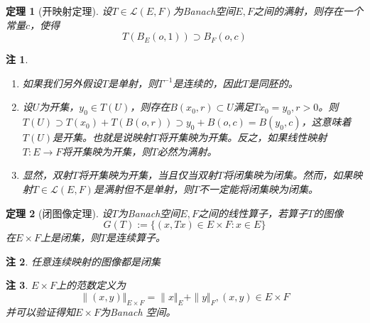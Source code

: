 \documentclass{article}                     %
\numberwithin{equation}{section}            %
\numberwithin{figure}{section}              %
\numberwithin{table}{section}               %
\newtheorem{theorem}{\indent 定理}[section] %
\newtheorem{remark}{\indent 注}[section]
\begin{document}
\begin{theorem}[开映射定理]
    设$T\in \mathcal{L} (E,F)$为Banach空间$E,F$之间的满射，则存在一个常量$c$，使得
    $$T(B_E(o,1))\supset B_F(o,c)$$
\end{theorem}
\begin{remark}
    \begin{enumerate}
        \item 如果我们另外假设$T$是单射，则$T^{-1}$是连续的，因此$T$是同胚的。
        \item 设$U$为开集，$y_0\in T(U)$，则存在$B(x_0,r)\subset U$满足$Tx_0=y_0,r>0$。则$T(U)\supset T(x_0)+T(B(o,r))\supset y_0+B(o,c)=B(y_0,c)$，这意味着$T(U)$是开集。也就是说映射$T$将开集映为开集。反之，如果线性映射$T:E\to F$将开集映为开集，则$T$必然为满射。
        \item 显然，双射$T$将开集映为开集，当且仅当双射$T$将闭集映为闭集。然而，如果映射$T\in \mathcal{L} (E,F)$是满射但不是单射，则$T$不一定能将闭集映为闭集。
    \end{enumerate} 
\end{remark}












\begin{theorem}[闭图像定理]
    设$T$为Banach空间$E,F$之间的线性算子，若算子$T$的图像
    $$G(T):=\{(x,Tx)\in E\times F:x\in E\}$$
    在$E\times F$上是闭集，则$T$是连续算子。
\end{theorem}
\begin{remark}
    任意连续映射的图像都是闭集
\end{remark}
\begin{remark}
    $E\times F$上的范数定义为
    $$\| (x,y)\Vert_{E\times F} =\| x\Vert_E +\| y\Vert _F,(x,y)\in E\times F$$
    并可以验证得知$E\times F$为Banach 空间。
\end{remark}
\end{document}
